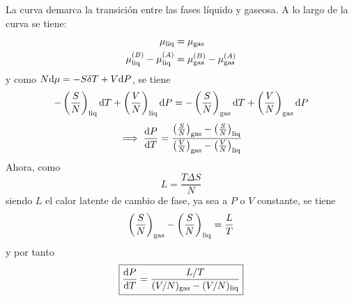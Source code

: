 La curva demarca la transición entre las fases líquido y gaseosa. A lo largo de la curva se tiene:
\begin{align}
  \mu_{\rm liq}&=\mu_{\rm gas}\\
  \mu_{\rm liq}^{(B)}-\mu_{\rm liq}^{(A)}&=\mu_{\rm gas}^{(B)}-\mu_{\rm gas}^{(A)}
\end{align}
y como $N\dd\mu=-S\delta T+V\dd P$, se tiene
\begin{equation}
  -\left(\frac{S}{N}\right)_{\rm liq}\dd T+\left(\frac{V}{N}\right)_{\rm liq}\dd P= -\left(\frac{S}{N}\right)_{\rm gas}\dd T+\left(\frac{V}{N}\right)_{\rm gas}\dd P
\end{equation}
\begin{equation}
  \implies \dv{P}{T}=\frac{\left(\frac{S}{N}\right)_{\rm gas}-\left(\frac{S}{N}\right)_{\rm liq}}{\left(\frac{V}{N}\right)_{\rm gas}-\left(\frac{V}{N}\right)_{\rm liq}}
\end{equation}
Ahora, como
\begin{equation}
  L=\frac{T\Delta S}{N}
\end{equation}
siendo $L$ el calor latente de cambio de fase, ya sea a $P$ o $V$ constante, se tiene
\begin{equation}
  \left(\frac{S}{N}\right)_{\rm gas}-\left(\frac{S}{N}\right)_{\rm liq}=\frac{L}{T}
\end{equation}
y por tanto
\begin{equation}
	\boxed{\dv{P}{T}=\frac{L/T}{(V/N)_{\rm gas}-(V/N)_{\rm liq}}}
\end{equation}








































































